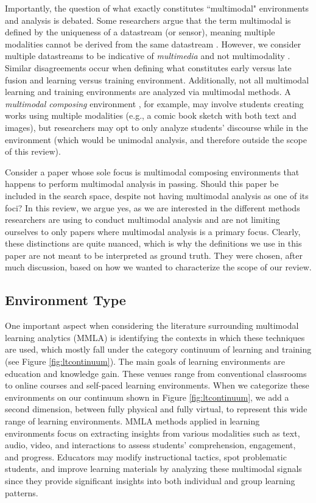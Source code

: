 \documentclass[manuscript,screen,review]{acmart}
\begin{document}
Importantly, the question of what exactly constitutes ``multimodal" environments and analysis is debated. Some researchers argue that the term multimodal is defined by the uniqueness of a datastream (or sensor), meaning multiple modalities cannot be derived from the same datastream \cite{}. However, we consider multiple datastreams to be indicative of \textit{multimedia} and not multimodality \cite{}. Similar disagreements occur when defining what constitutes early versus late fusion and learning versus training environment. Additionally, not all multimodal learning and training environments are analyzed via multimodal methods. A \textit{multimodal composing} environment \cite{}, for example, may involve students creating works using multiple modalities (e.g., a comic book sketch with both text and images), but researchers may opt to only analyze students' discourse while in the environment (which would be unimodal analysis, and therefore outside the scope of this review). 

Consider a paper whose sole focus is multimodal composing environments that happens to perform multimodal analysis in passing. Should this paper be included in the search space, despite not having multimodal analysis as one of its foci? In this review, we argue yes, as we are interested in the different methods researchers are using to conduct multimodal analysis and are not limiting ourselves to only papers where multimodal analysis is a primary focus. Clearly, these distinctions are quite nuanced, which is why the definitions we use in this paper are not meant to be interpreted as ground truth. They were chosen, after much discussion, based on how we wanted to characterize the scope of our review.


\subsection{Environment Type}\label{subsec:environment_type} %


One important aspect when considering the literature surrounding multimodal learning analytics (MMLA) is identifying the contexts in which these techniques are used, which mostly fall under the category continuum of learning and training (see Figure \ref{fig:ltcontinuum}). The main goals of learning environments are education and knowledge gain. These venues range from conventional classrooms to online courses and self-paced learning environments. When we categorize these environments on our continuum shown in Figure \ref{fig:ltcontinuum}, we add a second dimension, between fully physical and fully virtual, to represent this wide range of learning environments. MMLA methods applied in learning environments focus on extracting insights from various modalities such as text, audio, video, and interactions to assess students' comprehension, engagement, and progress. Educators may modify instructional tactics, spot problematic students, and improve learning materials by analyzing these multimodal signals since they provide significant insights into both individual and group learning patterns.
\end{document}
